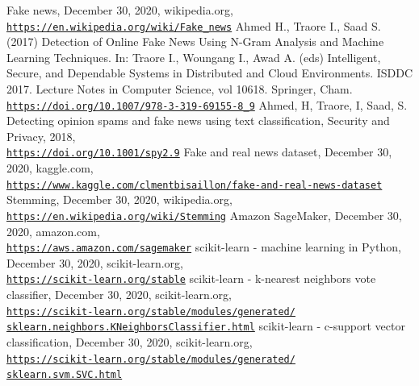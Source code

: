 \documentclass[a4paper,12pt,nottoc]{article}
\begin{document}
\clearpage
\begin{thebibliography}{9}
 Fake news, December 30, 2020, wikipedia.org, \\\href{https://en.wikipedia.org/wiki/Fake_news}{\texttt{https://en.wikipedia.org/wiki/Fake\_news}}
 Ahmed H., Traore I., Saad S. (2017) Detection of Online Fake News Using N-Gram Analysis and Machine Learning Techniques. In: Traore I., Woungang I., Awad A. (eds) Intelligent, Secure, and Dependable Systems in Distributed and Cloud Environments. ISDDC 2017. Lecture Notes in Computer Science, vol 10618. Springer, Cham. \\\href{https://doi.org/10.1007/978-3-319-69155-8_9}{\texttt{https://doi.org/10.1007/978-3-319-69155-8\_9}}
 Ahmed, H, Traore, I, Saad, S. Detecting opinion spams and fake news using text classification, Security and Privacy, 2018, \\\href{https://doi.org/10.1001/spy2.9}{\texttt{https://doi.org/10.1001/spy2.9}}
 Fake and real news dataset, December 30, 2020, kaggle.com, \\\href{https://www.kaggle.com/clmentbisaillon/fake-and-real-news-dataset}{\texttt{https://www.kaggle.com/clmentbisaillon/fake-and-real-news-dataset}}
 Stemming, December 30, 2020, wikipedia.org, \\\href{https://en.wikipedia.org/wiki/Stemming}{\texttt{https://en.wikipedia.org/wiki/Stemming}}
 Amazon SageMaker, December 30, 2020, amazon.com, \\\href{https://aws.amazon.com/sagemaker}{\texttt{https://aws.amazon.com/sagemaker}}
 scikit-learn - machine learning in Python, December 30, 2020, scikit-learn.org, \\\href{https://scikit-learn.org/stable}{\texttt{https://scikit-learn.org/stable}}
 scikit-learn - k-nearest neighbors vote classifier, December 30, 2020, scikit-learn.org, \\\href{https://scikit-learn.org/stable/modules/generated/sklearn.neighbors.KNeighborsClassifier.html}{\texttt{https://scikit-learn.org/stable/modules/generated/\\sklearn.neighbors.KNeighborsClassifier.html}}
 scikit-learn - c-support vector classification, December 30, 2020, scikit-learn.org, \\\href{https://scikit-learn.org/stable/modules/generated/sklearn.svm.SVC.html}{\texttt{https://scikit-learn.org/stable/modules/generated/\\sklearn.svm.SVC.html}}

\end{thebibliography}
\end{document}
